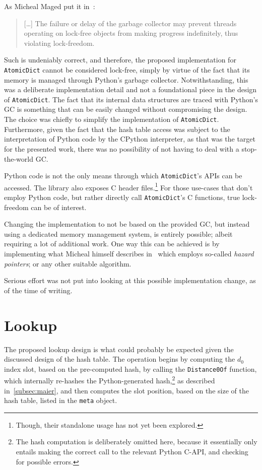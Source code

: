 As Micheal Maged put it in~\cite[\S2.3]{micheal-hash-tables}:
\begin{quote}
	[\ldots] The failure or delay of the garbage collector may prevent threads operating on lock-free objects from making progress indefinitely, thus violating lock-freedom.
\end{quote}

Such is undeniably correct, and therefore, the proposed implementation for \texttt{AtomicDict} cannot be considered lock-free, simply by virtue of the fact that its memory is managed through Python's garbage collector.
Notwithstanding, this was a deliberate implementation detail and not a foundational piece in the design of \texttt{AtomicDict}.
The fact that its internal data structures are traced with Python's GC is something that can be easily changed without compromising the design.
The choice was chiefly to simplify the implementation of \texttt{AtomicDict}.
Furthermore, given the fact that the hash table access was subject to the interpretation of Python code by the CPython interpreter, as that was the target for the presented work, there was no possibility of not having to deal with a stop-the-world GC\@.

Python code is not the only means through which \texttt{AtomicDict}'s APIs can be accessed.
The library also exposes C header files.\footnote{%
	Though, their standalone usage has not yet been explored.
}
For those use-cases that don't employ Python code, but rather directly call \texttt{AtomicDict}'s C functions, true lock-freedom can be of interest.

Changing the implementation to not be based on the provided GC, but instead using a dedicated memory management system, is entirely possible; albeit requiring a lot of additional work.
One way this can be achieved is by implementing what Micheal himself describes in~\cite{micheal-safe-reclamation} which employs so-called \emph{hazard pointers}; or any other suitable algorithm.

Serious effort was not put into looking at this possible implementation change, as of the time of writing.


\section{Lookup}\label{sec:lookup}

The proposed lookup design is what could probably be expected given the discussed design of the hash table.
The operation begins by computing the $d_0$ index slot, based on the pre-computed hash, by calling the \texttt{Distance0Of} function, which internally re-hashes the Python-generated hash,\footnote{%
	The hash computation is deliberately omitted here, because it essentially only entails making the correct call to the relevant Python C-API, and checking for possible errors.
} as described in~\ref{subsec:maier}, and then computes the slot position, based on the size of the hash table, listed in the \texttt{meta} object.

